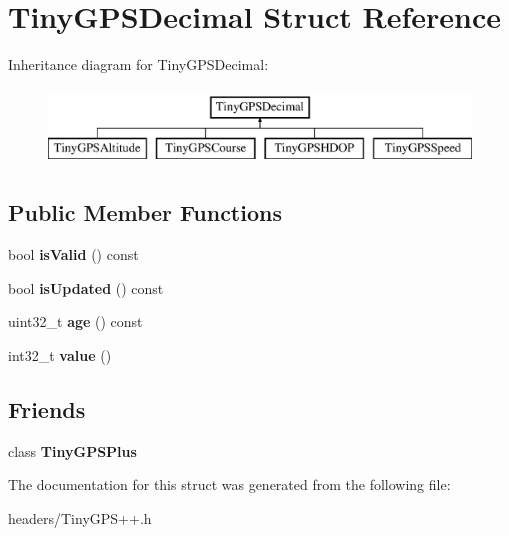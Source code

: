 \section{Tiny\+G\+P\+S\+Decimal Struct Reference}
\label{struct_tiny_g_p_s_decimal}
Inheritance diagram for Tiny\+G\+P\+S\+Decimal\+:\begin{figure}[H]
\begin{center}
\leavevmode
\includegraphics[height=2.000000cm]{struct_tiny_g_p_s_decimal}
\end{center}
\end{figure}
\subsection*{Public Member Functions}
\begin{DoxyCompactItemize}
\item 
bool {\bfseries is\+Valid} () const \label{struct_tiny_g_p_s_decimal_a2a1d868525e903eb193b7a36cdd76984}

\item 
bool {\bfseries is\+Updated} () const \label{struct_tiny_g_p_s_decimal_ae8b7f9f7719c2974ebd3b34759493d15}

\item 
uint32\+\_\+t {\bfseries age} () const \label{struct_tiny_g_p_s_decimal_ab80191a3e02c92ad3f674b5df2ab752f}

\item 
int32\+\_\+t {\bfseries value} ()\label{struct_tiny_g_p_s_decimal_ac3ce80976e5d8456e9f211b910a6cb19}

\end{DoxyCompactItemize}
\subsection*{Friends}
\begin{DoxyCompactItemize}
\item 
class {\bfseries Tiny\+G\+P\+S\+Plus}\label{struct_tiny_g_p_s_decimal_a6501fd5ef19ae166d43e0e5781609ee2}

\end{DoxyCompactItemize}


The documentation for this struct was generated from the following file\+:\begin{DoxyCompactItemize}
\item 
headers/Tiny\+G\+P\+S++.\+h\end{DoxyCompactItemize}
